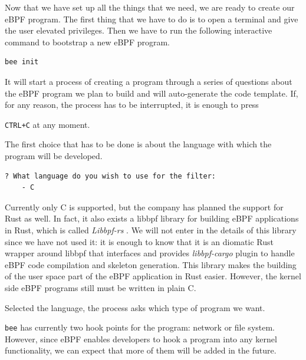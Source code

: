 Now that we have set up all the things that we need, we are ready to create our eBPF program.
The first thing that we have to do is to open a terminal and give the user elevated privileges.
Then we have to run the following interactive command to bootstrap a new eBPF program.

\begin{lstlisting}[style=commandline, language=bash, caption={\colorbox{backcolour}{\lstinline[style=commandline, language=bash]|bee|} init command.}]
	bee init
\end{lstlisting}

It will start a process of creating a program through a series of questions about the eBPF program we plan to build and will auto-generate the code template.
If, for any reason, the process has to be interrupted, it is enough to press \raggedright\colorbox{backcolour}{\lstinline[style=commandline, language=bash]|CTRL+C|} at any moment.

The first choice that has to be done is about the language with which the program will be developed.

\begin{lstlisting}[style=commandline, language=bash, caption={\colorbox{backcolour}{\lstinline[style=commandline, language=bash]|bee|} language selection.}]
	? What language do you wish to use for the filter: 
	- C
\end{lstlisting}

Currently only C is supported, but the company has planned the support for Rust as well.
In fact, it also exists a libbpf library for building eBPF applications in Rust, which is called \textit{Libbpf-rs} \cite{libbpfRustGithubRepo}.
We will not enter in the details of this library since we have not used it: it is enough to know that it is an diomatic Rust wrapper around libbpf that interfaces and provides \textit{libbpf-cargo} plugin to handle eBPF code compilation and skeleton generation.
This library makes the building of the user space part of the eBPF application in Rust easier.
However, the kernel side eBPF programs still must be written in plain C.

Selected the language, the process asks which type of program we want.
\raggedright\colorbox{backcolour}{\lstinline[style=commandline, language=bash]|bee|} has currently two hook points for the program: network or file system.
However, since eBPF enables developers to hook a program into any kernel functionality, we can expect that more of them will be added in the future.

